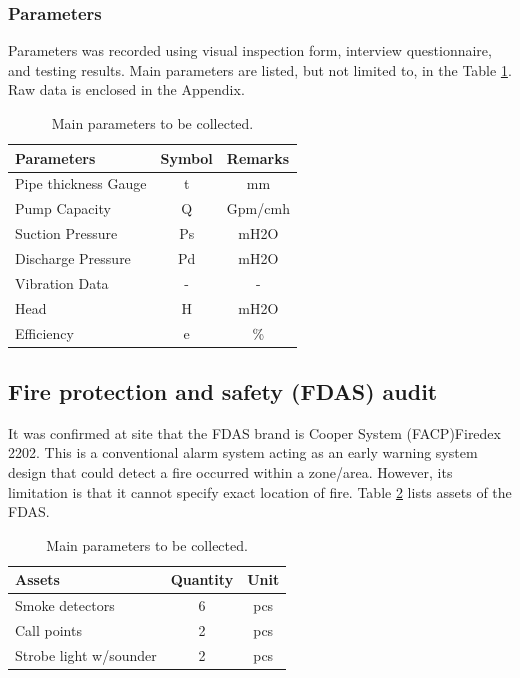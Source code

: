 \subsubsection{Parameters}
Parameters was recorded using visual inspection form, interview questionnaire, and testing results. Main parameters are listed, but not limited to, in the Table \ref{ch02_tbl_parameter}. Raw data is enclosed in the Appendix.

\begin{table}[h]
	\caption{Main parameters to be collected.}
	\label{ch02_tbl_parameter}
	{\footnotesize
\begin{tabular}{l|l|l}
	\hline
	Parameters & \multicolumn{1}{c|}{Symbol} & Remarks \\ 
	\hline
	Pipe thickness Gauge & \multicolumn{1}{c|}{t} & \multicolumn{1}{c}{mm} \\ 
	Pump Capacity & \multicolumn{1}{c|}{Q} & \multicolumn{1}{c}{Gpm/cmh} \\ 
	Suction Pressure  & \multicolumn{1}{c|}{Ps} & \multicolumn{1}{c}{mH2O} \\ 
	Discharge Pressure & \multicolumn{1}{c|}{Pd} & \multicolumn{1}{c}{mH2O} \\ 
	Vibration Data  & \multicolumn{1}{c|}{-} & \multicolumn{1}{c}{-} \\ 
	Head & \multicolumn{1}{c|}{H} & \multicolumn{1}{c}{mH2O} \\ 
	Efficiency  & \multicolumn{1}{c|}{e} & \multicolumn{1}{c}{\%} \\ 
		\hline
	\end{tabular}		
	}
\end{table}


\subsection{Fire protection and safety (FDAS) audit}
\label{234}
It was confirmed at site that the FDAS brand is Cooper System (FACP)Firedex 2202. This is a conventional alarm system acting as an early warning system design that could detect a fire occurred within a zone/area. However, its limitation is that it cannot specify exact location of fire. Table \ref{ch02_tbl_fdas01} lists assets of the FDAS.

\begin{table}[h]
	\caption{Main parameters to be collected.}
	\label{ch02_tbl_fdas01}
	{\footnotesize
	\begin{tabular}{l|l|l}
		\hline
		Assets & Quantity & Unit \\ 
		\hline
		Smoke detectors & \multicolumn{1}{c|}{6} & \multicolumn{1}{c}{pcs} \\ 
		Call points & \multicolumn{1}{c|}{2} & \multicolumn{1}{c}{pcs} \\ 
		Strobe light w/sounder & \multicolumn{1}{c|}{2} & \multicolumn{1}{c}{pcs} \\ 
		\hline
	\end{tabular}
	}
\end{table}

